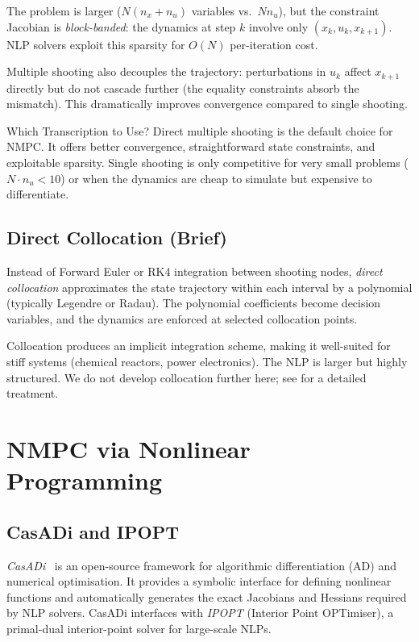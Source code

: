 The problem is larger ($N(n_x + n_u)$ variables vs.\ $N n_u$), but the constraint Jacobian is \emph{block-banded}: the dynamics at step $k$ involve only $(x_k, u_k, x_{k+1})$. NLP solvers exploit this sparsity for $O(N)$ per-iteration cost.

Multiple shooting also decouples the trajectory: perturbations in $u_k$ affect $x_{k+1}$ directly but do not cascade further (the equality constraints absorb the mismatch). This dramatically improves convergence compared to single shooting.

\begin{alertbox}{Which Transcription to Use?}
	Direct multiple shooting is the default choice for NMPC. It offers better convergence, straightforward state constraints, and exploitable sparsity. Single shooting is only competitive for very small problems ($N \cdot n_u < 10$) or when the dynamics are cheap to simulate but expensive to differentiate.
\end{alertbox}

\subsection{Direct Collocation (Brief)}

Instead of Forward Euler or RK4 integration between shooting nodes, \emph{direct collocation} approximates the state trajectory within each interval by a polynomial (typically Legendre or Radau). The polynomial coefficients become decision variables, and the dynamics are enforced at selected collocation points.

Collocation produces an implicit integration scheme, making it well-suited for stiff systems (chemical reactors, power electronics). The NLP is larger but highly structured. We do not develop collocation further here; see \cite{Rawlings2017} for a detailed treatment.


\section{NMPC via Nonlinear Programming}
\label{sec:nmpc_nlp}

\subsection{CasADi and IPOPT}

\emph{CasADi}~\cite{Andersson2019} is an open-source framework for algorithmic differentiation (AD) and numerical optimisation. It provides a symbolic interface for defining nonlinear functions and automatically generates the exact Jacobians and Hessians required by NLP solvers. CasADi interfaces with \emph{IPOPT} (Interior Point OPTimiser), a primal-dual interior-point solver for large-scale NLPs.

